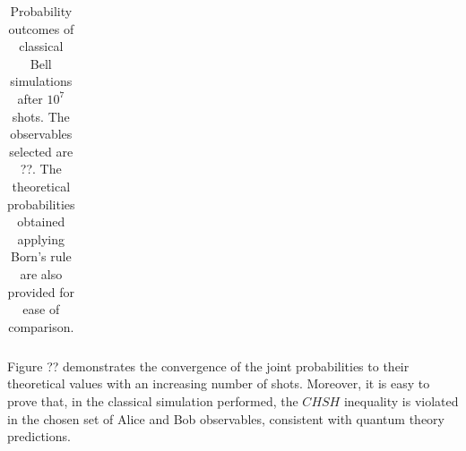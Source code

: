 \begin{table}[h!]
\centering
\begin{tabular}{c c c c c} 
 \toprule
 \bottomrule
\end{tabular}
\caption{Probability outcomes of classical Bell simulations after $10^{7}$ shots. The observables selected are ??. The theoretical probabilities obtained applying Born’s rule are also
provided for ease of comparison.}
\label{table:classical_results_bell}
\end{table}

Figure ?? demonstrates the convergence of the joint probabilities to their theoretical values with an increasing number of shots. Moreover, it is easy to prove that, in the classical simulation performed, the $\mathit{CHSH}$ inequality is violated in the chosen set of Alice and Bob observables, consistent with quantum theory predictions.